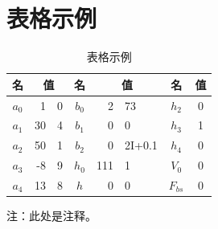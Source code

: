 \section{表格示例}
\begin{table}[H]
	\caption{表格示例}	\label{table1}
	\vspace{-0.5 cm} 
	\begin{center}
		\begin{tabular}{cr@{.}lcr@{.}lcc}
			\toprule[1pt]
			 名  & \multicolumn{2}{c}{值} &  名  & \multicolumn{2}{c}{值} &    名     & 值 \\ \midrule[0.6pt]
			$a_0$ &  1 & 0              & $b_0$ &   2 & 73            &   $h_2$    & 0 \\
			$a_1$ &  30 & 4              & $b_1$ &   0 & 0               &   $h_3$    & 1 \\
			$a_2$ & 50 & 1              & $b_2$ &   0 & 2I+0.1          &   $h_4$    & 0 \\
			$a_3$ & -8 & 9              & $h_0$ & 111 & 1               &   $V_0$    & 0 \\
			$a_4$ & 13 & 8              & $h$ &   0 & 0               & $F_{bs}$ & 0 \\ \bottomrule[1pt]
		\end{tabular}
	\end{center}
	\vspace{-0.3 cm} \hspace{4.6 cm} { 注：此处是注释。}
\end{table} \vspace{-7pt}


\clearpage
